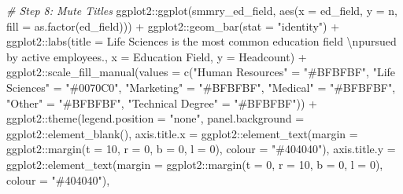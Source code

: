 \documentclass[
]{book}
\newenvironment{Shaded}{\begin{snugshade}}{\end{snugshade}}
\newcommand{\AttributeTok}[1]{\textcolor[rgb]{0.77,0.63,0.00}{#1}}
\newcommand{\CommentTok}[1]{\textcolor[rgb]{0.56,0.35,0.01}{\textit{#1}}}
\newcommand{\DecValTok}[1]{\textcolor[rgb]{0.00,0.00,0.81}{#1}}
\newcommand{\FunctionTok}[1]{\textcolor[rgb]{0.00,0.00,0.00}{#1}}
\newcommand{\NormalTok}[1]{#1}
\newcommand{\OtherTok}[1]{\textcolor[rgb]{0.56,0.35,0.01}{#1}}
\newcommand{\SpecialCharTok}[1]{\textcolor[rgb]{0.00,0.00,0.00}{#1}}
\newcommand{\StringTok}[1]{\textcolor[rgb]{0.31,0.60,0.02}{#1}}
\begin{document}
\begin{Shaded}
\begin{Highlighting}[]
\CommentTok{\# Step 8: Mute Titles}
\NormalTok{ggplot2}\SpecialCharTok{::}\FunctionTok{ggplot}\NormalTok{(smmry\_ed\_field, }\FunctionTok{aes}\NormalTok{(}\AttributeTok{x =}\NormalTok{ ed\_field, }\AttributeTok{y =}\NormalTok{ n, }\AttributeTok{fill =} \FunctionTok{as.factor}\NormalTok{(ed\_field))) }\SpecialCharTok{+}
\NormalTok{ggplot2}\SpecialCharTok{::}\FunctionTok{geom\_bar}\NormalTok{(}\AttributeTok{stat =} \StringTok{"identity"}\NormalTok{) }\SpecialCharTok{+}
\NormalTok{ggplot2}\SpecialCharTok{::}\FunctionTok{labs}\NormalTok{(}\AttributeTok{title =} \StringTok{\textquotesingle{}Life Sciences is the most common education field }\SpecialCharTok{\textbackslash{}n}\StringTok{pursued by active employees.\textquotesingle{}}\NormalTok{, }\AttributeTok{x =} \StringTok{\textquotesingle{}Education Field\textquotesingle{}}\NormalTok{, }\AttributeTok{y =} \StringTok{\textquotesingle{}Headcount\textquotesingle{}}\NormalTok{) }\SpecialCharTok{+}
\NormalTok{ggplot2}\SpecialCharTok{::}\FunctionTok{scale\_fill\_manual}\NormalTok{(}\AttributeTok{values =} \FunctionTok{c}\NormalTok{(}\StringTok{"Human Resources"} \OtherTok{=} \StringTok{"\#BFBFBF"}\NormalTok{, }
                                      \StringTok{"Life Sciences"} \OtherTok{=} \StringTok{"\#0070C0"}\NormalTok{, }
                                      \StringTok{"Marketing"} \OtherTok{=} \StringTok{"\#BFBFBF"}\NormalTok{, }
                                      \StringTok{"Medical"} \OtherTok{=} \StringTok{"\#BFBFBF"}\NormalTok{,}
                                      \StringTok{"Other"} \OtherTok{=} \StringTok{"\#BFBFBF"}\NormalTok{,}
                                      \StringTok{"Technical Degree"} \OtherTok{=} \StringTok{"\#BFBFBF"}\NormalTok{)) }\SpecialCharTok{+}
\NormalTok{ggplot2}\SpecialCharTok{::}\FunctionTok{theme}\NormalTok{(}\AttributeTok{legend.position =} \StringTok{"none"}\NormalTok{,}
               \AttributeTok{panel.background =}\NormalTok{ ggplot2}\SpecialCharTok{::}\FunctionTok{element\_blank}\NormalTok{(),}
               \AttributeTok{axis.title.x =}\NormalTok{ ggplot2}\SpecialCharTok{::}\FunctionTok{element\_text}\NormalTok{(}\AttributeTok{margin =}\NormalTok{ ggplot2}\SpecialCharTok{::}\FunctionTok{margin}\NormalTok{(}\AttributeTok{t =} \DecValTok{10}\NormalTok{, }\AttributeTok{r =} \DecValTok{0}\NormalTok{, }\AttributeTok{b =} \DecValTok{0}\NormalTok{, }\AttributeTok{l =} \DecValTok{0}\NormalTok{), }\AttributeTok{colour =} \StringTok{"\#404040"}\NormalTok{),}
               \AttributeTok{axis.title.y =}\NormalTok{ ggplot2}\SpecialCharTok{::}\FunctionTok{element\_text}\NormalTok{(}\AttributeTok{margin =}\NormalTok{ ggplot2}\SpecialCharTok{::}\FunctionTok{margin}\NormalTok{(}\AttributeTok{t =} \DecValTok{0}\NormalTok{, }\AttributeTok{r =} \DecValTok{10}\NormalTok{, }\AttributeTok{b =} \DecValTok{0}\NormalTok{, }\AttributeTok{l =} \DecValTok{0}\NormalTok{), }\AttributeTok{colour =} \StringTok{"\#404040"}\NormalTok{),}

\end{Highlighting}
\end{Shaded}
\end{document}
